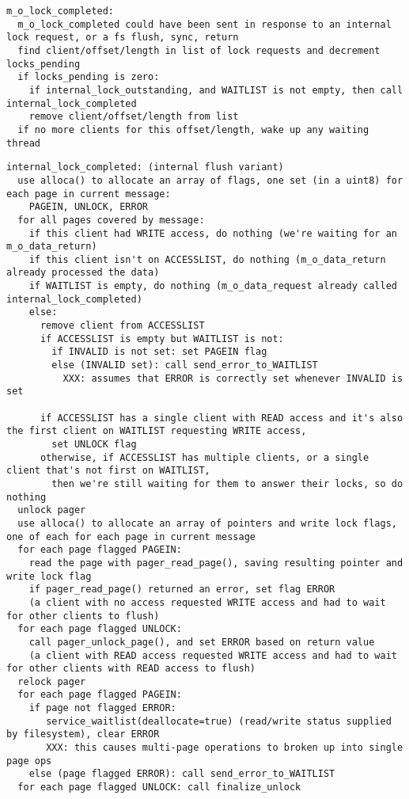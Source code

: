 \documentclass{article}
\begin{document}
\begin{verbatim}
m_o_lock_completed:
  m_o_lock_completed could have been sent in response to an internal lock request, or a fs flush, sync, return
  find client/offset/length in list of lock requests and decrement locks_pending
  if locks_pending is zero:
    if internal_lock_outstanding, and WAITLIST is not empty, then call internal_lock_completed
    remove client/offset/length from list
  if no more clients for this offset/length, wake up any waiting thread
\end{verbatim}

\begin{verbatim}
internal_lock_completed: (internal flush variant)
  use alloca() to allocate an array of flags, one set (in a uint8) for each page in current message:
    PAGEIN, UNLOCK, ERROR
  for all pages covered by message:
    if this client had WRITE access, do nothing (we're waiting for an m_o_data_return)
    if this client isn't on ACCESSLIST, do nothing (m_o_data_return already processed the data)
    if WAITLIST is empty, do nothing (m_o_data_request already called internal_lock_completed)
    else:
      remove client from ACCESSLIST
      if ACCESSLIST is empty but WAITLIST is not:
        if INVALID is not set: set PAGEIN flag
        else (INVALID set): call send_error_to_WAITLIST
          XXX: assumes that ERROR is correctly set whenever INVALID is set

      if ACCESSLIST has a single client with READ access and it's also the first client on WAITLIST requesting WRITE access,
        set UNLOCK flag
      otherwise, if ACCESSLIST has multiple clients, or a single client that's not first on WAITLIST,
        then we're still waiting for them to answer their locks, so do nothing
  unlock pager
  use alloca() to allocate an array of pointers and write lock flags, one of each for each page in current message
  for each page flagged PAGEIN:
    read the page with pager_read_page(), saving resulting pointer and write lock flag
    if pager_read_page() returned an error, set flag ERROR
    (a client with no access requested WRITE access and had to wait for other clients to flush)
  for each page flagged UNLOCK:
    call pager_unlock_page(), and set ERROR based on return value
    (a client with READ access requested WRITE access and had to wait for other clients with READ access to flush)
  relock pager
  for each page flagged PAGEIN:
    if page not flagged ERROR:
       service_waitlist(deallocate=true) (read/write status supplied by filesystem), clear ERROR
       XXX: this causes multi-page operations to broken up into single page ops
    else (page flagged ERROR): call send_error_to_WAITLIST
  for each page flagged UNLOCK: call finalize_unlock
\end{verbatim}
\end{document}
